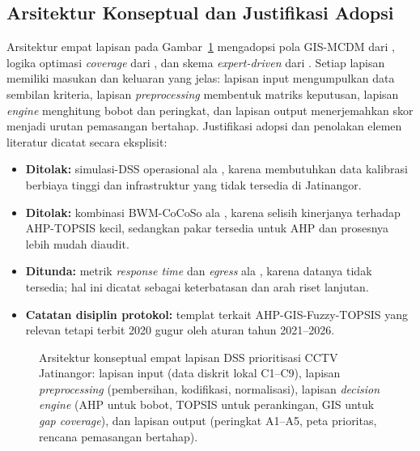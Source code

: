 \documentclass[10pt,twocolumn,a4paper]{article}
\begin{document}
\subsection{Arsitektur Konseptual dan Justifikasi Adopsi}
Arsitektur empat lapisan pada Gambar~\ref{fig:arch} mengadopsi pola GIS-MCDM dari \cite{feiz,kab}, logika optimasi \textit{coverage} dari \cite{wang,yuhang}, dan skema \textit{expert-driven} dari \cite{ahmed,baddour}. Setiap lapisan memiliki masukan dan keluaran yang jelas: lapisan input mengumpulkan data sembilan kriteria, lapisan \textit{preprocessing} membentuk matriks keputusan, lapisan \textit{engine} menghitung bobot dan peringkat, dan lapisan output menerjemahkan skor menjadi urutan pemasangan bertahap. Justifikasi adopsi dan penolakan elemen literatur dicatat secara eksplisit:
\begin{itemize}
\item \textbf{Ditolak:} simulasi-DSS operasional ala \cite{gonz}, karena membutuhkan data kalibrasi berbiaya tinggi dan infrastruktur yang tidak tersedia di Jatinangor.
\item \textbf{Ditolak:} kombinasi BWM-CoCoSo ala \cite{baddour}, karena selisih kinerjanya terhadap AHP-TOPSIS kecil, sedangkan pakar tersedia untuk AHP dan prosesnya lebih mudah diaudit.
\item \textbf{Ditunda:} metrik \textit{response time} dan \textit{egress} ala \cite{gonz}, karena datanya tidak tersedia; hal ini dicatat sebagai keterbatasan dan arah riset lanjutan.
\item \textbf{Catatan disiplin protokol:} templat terkait AHP-GIS-Fuzzy-TOPSIS yang relevan tetapi terbit 2020 gugur oleh aturan tahun 2021--2026.
\end{itemize}

\begin{figure}[!t]
\centering

\caption{Arsitektur konseptual empat lapisan DSS prioritisasi CCTV Jatinangor: lapisan input (data diskrit lokal C1--C9), lapisan \textit{preprocessing} (pembersihan, kodifikasi, normalisasi), lapisan \textit{decision engine} (AHP untuk bobot, TOPSIS untuk perankingan, GIS untuk \textit{gap coverage}), dan lapisan output (peringkat A1--A5, peta prioritas, rencana pemasangan bertahap).}
\label{fig:arch}
\end{figure}
\end{document}
